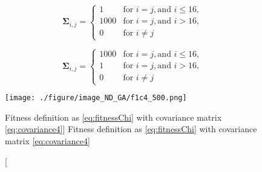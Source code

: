 %
%
%
%
%
\begin{equation}
\label{eq:covariance4}
\mathbf{\Sigma}_{i,j} =
\left\{
    \begin{array}{ll}
    1 & \mbox{for } i=j, \mbox{and } i\leq16, \\
    1000 & \mbox{for } i=j, \mbox{and } i>16, \\
    0 & \mbox{for } i \neq j
    \end{array} \right.
\end{equation}



\begin{equation}
\label{eq:covariance5}
\mathbf{\Sigma}_{i,j} =
\left\{
    \begin{array}{ll}
    1000 & \mbox{for } i=j, \mbox{and } i\leq16, \\
    1 & \mbox{for } i=j, \mbox{and } i>16, \\
    0 & \mbox{for } i \neq j
    \end{array} \right.
\end{equation}



\begin{figure}
    \centering
    \texttt{[image: ./figure/image\_ND\_GA/f1c4\_500.png]}
    \caption
    [Fitness definition as \ref{eq:fitnessChi} with covariance matrix \ref{eq:covariance4}]
    {Fitness definition as \ref{eq:fitnessChi} with covariance matrix \ref{eq:covariance4}}
    \label{fig:f1c4_500.png}
    \end{figure}


